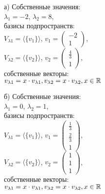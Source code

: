 \documentclass[a4paper,12pt]{article}
\newcommand{\aanswer}{\par\vspace{5pt}\noindent{\bf Ответ. }}
\newcommand{\bpm}{\begin{pmatrix}}
\newcommand{\epm}{\end{pmatrix}}
\begin{document}
\aanswer \par
\begin{multicols}{2}
а) Собственные значения: \\ $\lambda_1 = -2$, $\lambda_2 = 8$, \\
базисы подпространств: \\ 
$V_{\lambda1}=\langle \{v_1\} \rangle$,
$v_1 = \bpm -2 \\ 1 \epm$, \\
$V_{\lambda2}=\langle \{v_2\} \rangle$,
$v_2 = \bpm \frac{4}{3} \\ 1 \epm$, \\
собственные векторы: \\
$v_{\lambda1}=x\cdot v_{\lambda1}, \\
v_{\lambda2}=x\cdot v_{\lambda2}, x \in \mathbb{R}$

\columnbreak
б) Собственные значения: \\ $\lambda_1 = 0$, $\lambda_2 = 1$, \\
базисы подпространств: \\ 
$V_{\lambda1}=\langle \{v_1\} \rangle$,
$v_1 = \bpm \frac{1}{3} \\ \frac{2}{3} \\ 1 \epm$, \\
$V_{\lambda2}=\langle \{v_2\} \rangle$,
$v_2 = \bpm 1 \\ 1 \\ 1 \epm$, \\
собственные векторы: \\
$v_{\lambda1}=x\cdot v_{\lambda1}, \\
v_{\lambda2}=x\cdot v_{\lambda2}, x \in \mathbb{R}$
\end{multicols}
\end{document}
